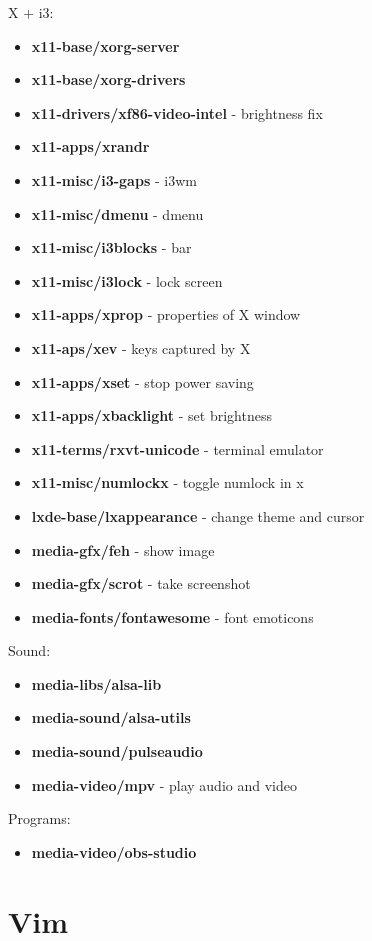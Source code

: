 \documentclass[10pt, a4paper, onecolumn, openany]{book}         %
\begin{document}
X + i3:
\begin{itemize}
    \item \textbf{x11-base/xorg-server}
    \item \textbf{x11-base/xorg-drivers}
    \item \textbf{x11-drivers/xf86-video-intel} - brightness fix
    \item \textbf{x11-apps/xrandr}
    \item \textbf{x11-misc/i3-gaps}     - i3wm
    \item \textbf{x11-misc/dmenu}       - dmenu
    \item \textbf{x11-misc/i3blocks}    - bar
    \item \textbf{x11-misc/i3lock}      - lock screen
    \item \textbf{x11-apps/xprop}       - properties of X window
    \item \textbf{x11-aps/xev}          - keys captured by X
    \item \textbf{x11-apps/xset}        - stop power saving
    \item \textbf{x11-apps/xbacklight}  - set brightness
    \item \textbf{x11-terms/rxvt-unicode} - terminal emulator
    \item \textbf{x11-misc/numlockx}    - toggle numlock in x
    \item \textbf{lxde-base/lxappearance} - change theme and cursor
    \item \textbf{media-gfx/feh}        - show image
    \item \textbf{media-gfx/scrot}      - take screenshot
    \item \textbf{media-fonts/fontawesome} - font emoticons
\end{itemize}
Sound:
\begin{itemize}
    \item \textbf{media-libs/alsa-lib}
    \item \textbf{media-sound/alsa-utils}
    \item \textbf{media-sound/pulseaudio}
    \item \textbf{media-video/mpv} - play audio and video
\end{itemize}
Programs:
\begin{itemize}
    \item \textbf{media-video/obs-studio}
\end{itemize}

\section{Vim}
\end{document}
